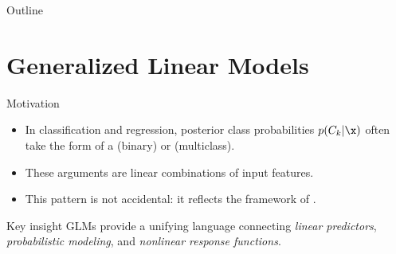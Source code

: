 \begin{frame}
  \titlepage
\end{frame}

\begin{frame}{Outline}
  \tableofcontents
\end{frame}

\section{Generalized Linear Models}

\begin{frame}{Motivation}
  \begin{itemize}
    \item In classification and regression, posterior class probabilities $p(C_k|\x)$ often take the form of a  (binary) or  (multiclass).
    \item These arguments are linear combinations of input features.
    \item This pattern is not accidental: it reflects the framework of .
  \end{itemize}
  \vspace{0.3cm}
  \begin{block}{Key insight}
    GLMs provide a unifying language connecting \emph{linear predictors}, \emph{probabilistic modeling}, and \emph{nonlinear response functions}.
  \end{block}
\end{frame}

